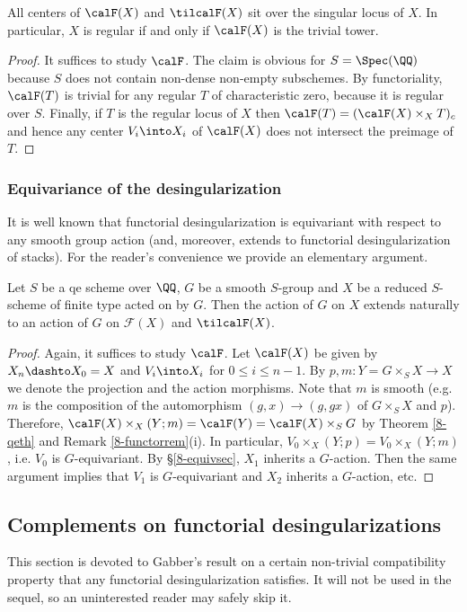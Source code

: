 \documentclass[10pt]{../fichiers-configuration-latex/smfart}
\begin{document}
\begin{corollary2}\label{8-reglocuscor} All centers of $\calF(X)$
and $\tilcalF(X)$ sit over the singular locus of $X$. In particular,
$X$ is regular if and only if $\calF(X)$ is the trivial tower.
\end{corollary2} \begin{proof} It suffices to study $\calF$. The
claim is obvious for $S=\Spec(\QQ)$ because $S$ does not contain
non-dense non-empty subschemes. By functoriality, $\calF(T)$ is
trivial for any regular $T$ of characteristic zero, because it is
regular over $S$. Finally, if $T$ is the regular locus of $X$ then
$\calF(T)=(\calF(X)\times_XT)_c$ and hence any center $V_i\into X_i$
of $\calF(X)$ does not intersect the preimage of $T$.  \end{proof}

\subsubsection{Equivariance of the
desingularization}\label{8-equivdessec} It is well known that
functorial desingularization is equivariant with respect to
any smooth group action (and, moreover, extends to functorial
desingularization of stacks). For the reader's convenience we
provide an elementary argument.

\begin{corollary2}\label{8-cor BMT group action} Let $S$ be
a qe scheme over $\QQ$, $G$ be a smooth $S$-group and $X$
be a reduced $S$-scheme of finite type acted on by $G$. Then
the action of $G$ on $X$ extends naturally to an action of
$G$ on $\mathscr{F}(X)$ and $\tilcalF(X)$.  \end{corollary2}
\begin{proof} Again, it suffices to study $\calF$. Let $\calF(X)$
be given by $X_n\dashto X_0=X$ and $V_i\into X_i$ for $0\le i\le
n-1$. By $p,m\colon Y=G\times_S X\to X$ we denote the projection
and the action morphisms. Note that $m$ is smooth (e.g. $m$ is the
composition of the automorphism $(g,x)\to(g,gx)$ of $G\times_S X$ and
$p$). Therefore, $\calF(X)\times_{X}(Y;m)=\calF(Y)=\calF(X)\times_SG$
by Theorem \ref{8-qeth} and Remark \ref{8-functorrem}(i). In
particular, $V_0\times_X (Y; p) = V_0\times_X(Y; m)$, i.e. $V_0$
is $G$-equivariant. By \S\ref{8-equivsec}, $X_1$ inherits
a $G$-action. Then the same argument implies that $V_1$ is
$G$-equivariant and $X_2$ inherits a $G$-action, etc.  \end{proof}

\subsection{Complements on functorial
desingularizations}\label{8-invarsec} This section is devoted to
Gabber's result on a certain non-trivial compatibility property
that any functorial desingularization satisfies. It will not be
used in the sequel, so an uninterested reader may safely skip it.
\end{document}
